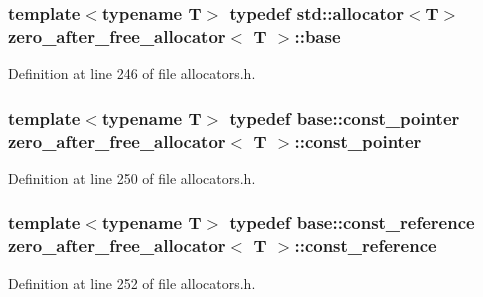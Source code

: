 \subsubsection[{base}]{\setlength{\rightskip}{0pt plus 5cm}template$<$typename T$>$ typedef std\+::allocator$<$T$>$ {\bf zero\+\_\+after\+\_\+free\+\_\+allocator}$<$ T $>$\+::{\bf base}}\label{structzero__after__free__allocator_aab907d58a45f5bf4baeaefb373f00987}


Definition at line 246 of file allocators.\+h.

\hypertarget{structzero__after__free__allocator_a197fbd41cb35428c2ed27c23b742ec9b}{}
\subsubsection[{const\+\_\+pointer}]{\setlength{\rightskip}{0pt plus 5cm}template$<$typename T$>$ typedef base\+::const\+\_\+pointer {\bf zero\+\_\+after\+\_\+free\+\_\+allocator}$<$ T $>$\+::{\bf const\+\_\+pointer}}\label{structzero__after__free__allocator_a197fbd41cb35428c2ed27c23b742ec9b}


Definition at line 250 of file allocators.\+h.

\hypertarget{structzero__after__free__allocator_ab9e83de52f17c19f263bef6ba258fbed}{}
\subsubsection[{const\+\_\+reference}]{\setlength{\rightskip}{0pt plus 5cm}template$<$typename T$>$ typedef base\+::const\+\_\+reference {\bf zero\+\_\+after\+\_\+free\+\_\+allocator}$<$ T $>$\+::{\bf const\+\_\+reference}}\label{structzero__after__free__allocator_ab9e83de52f17c19f263bef6ba258fbed}


Definition at line 252 of file allocators.\+h.

\hypertarget{structzero__after__free__allocator_ab45fc8fc90d403b3b44715616e167658}{}
